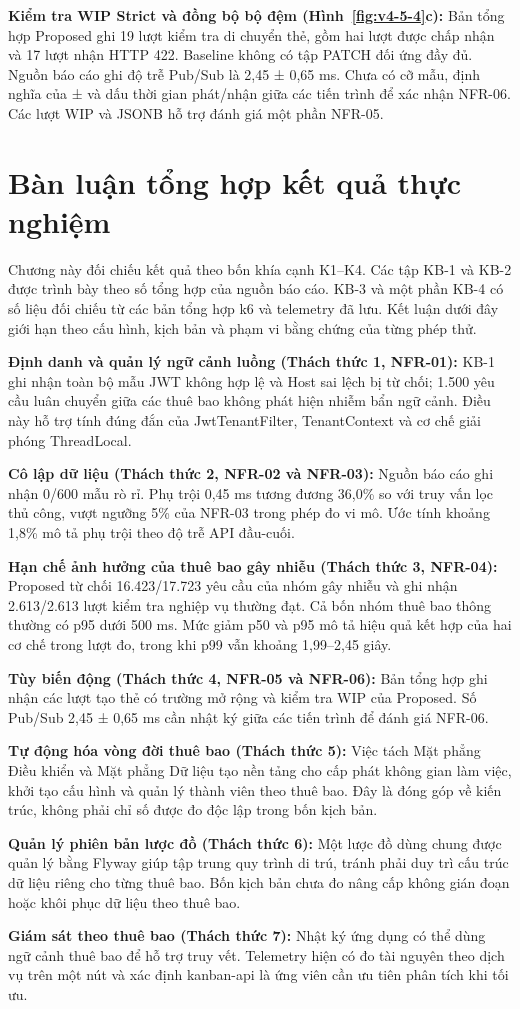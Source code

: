 \textbf{Kiểm tra WIP Strict và đồng bộ bộ đệm (Hình~\ref{fig:v4-5-4}c):} Bản tổng hợp Proposed ghi 19 lượt kiểm tra di chuyển thẻ, gồm hai lượt được chấp nhận và 17 lượt nhận HTTP 422. Baseline không có tập PATCH đối ứng đầy đủ. Nguồn báo cáo ghi độ trễ Pub/Sub là 2,45 ± 0,65 ms. Chưa có cỡ mẫu, định nghĩa của ± và dấu thời gian phát/nhận giữa các tiến trình để xác nhận NFR-06. Các lượt WIP và JSONB hỗ trợ đánh giá một phần NFR-05.

\section{Bàn luận tổng hợp kết quả thực nghiệm}\label{v4-sec-5-4}

Chương này đối chiếu kết quả theo bốn khía cạnh K1--K4. Các tập KB-1 và KB-2 được trình bày theo số tổng hợp của nguồn báo cáo. KB-3 và một phần KB-4 có số liệu đối chiếu từ các bản tổng hợp k6 và telemetry đã lưu. Kết luận dưới đây giới hạn theo cấu hình, kịch bản và phạm vi bằng chứng của từng phép thử.

\textbf{Định danh và quản lý ngữ cảnh luồng (Thách thức 1, NFR-01):} KB-1 ghi nhận toàn bộ mẫu JWT không hợp lệ và Host sai lệch bị từ chối; 1.500 yêu cầu luân chuyển giữa các thuê bao không phát hiện nhiễm bẩn ngữ cảnh. Điều này hỗ trợ tính đúng đắn của JwtTenantFilter, TenantContext và cơ chế giải phóng ThreadLocal.

\textbf{Cô lập dữ liệu (Thách thức 2, NFR-02 và NFR-03):} Nguồn báo cáo ghi nhận 0/600 mẫu rò rỉ. Phụ trội 0,45 ms tương đương 36,0\% so với truy vấn lọc thủ công, vượt ngưỡng 5\% của NFR-03 trong phép đo vi mô. Ước tính khoảng 1,8\% mô tả phụ trội theo độ trễ API đầu-cuối.

\textbf{Hạn chế ảnh hưởng của thuê bao gây nhiễu (Thách thức 3, NFR-04):} Proposed từ chối 16.423/17.723 yêu cầu của nhóm gây nhiễu và ghi nhận 2.613/2.613 lượt kiểm tra nghiệp vụ thường đạt. Cả bốn nhóm thuê bao thông thường có p95 dưới 500 ms. Mức giảm p50 và p95 mô tả hiệu quả kết hợp của hai cơ chế trong lượt đo, trong khi p99 vẫn khoảng 1,99--2,45 giây.

\textbf{Tùy biến động (Thách thức 4, NFR-05 và NFR-06):} Bản tổng hợp ghi nhận các lượt tạo thẻ có trường mở rộng và kiểm tra WIP của Proposed. Số Pub/Sub 2,45 ± 0,65 ms cần nhật ký giữa các tiến trình để đánh giá NFR-06.

\textbf{Tự động hóa vòng đời thuê bao (Thách thức 5):} Việc tách Mặt phẳng Điều khiển và Mặt phẳng Dữ liệu tạo nền tảng cho cấp phát không gian làm việc, khởi tạo cấu hình và quản lý thành viên theo thuê bao. Đây là đóng góp về kiến trúc, không phải chỉ số được đo độc lập trong bốn kịch bản.

\textbf{Quản lý phiên bản lược đồ (Thách thức 6):} Một lược đồ dùng chung được quản lý bằng Flyway giúp tập trung quy trình di trú, tránh phải duy trì cấu trúc dữ liệu riêng cho từng thuê bao. Bốn kịch bản chưa đo nâng cấp không gián đoạn hoặc khôi phục dữ liệu theo thuê bao.

\textbf{Giám sát theo thuê bao (Thách thức 7):} Nhật ký ứng dụng có thể dùng ngữ cảnh thuê bao để hỗ trợ truy vết. Telemetry hiện có đo tài nguyên theo dịch vụ trên một nút và xác định kanban-api là ứng viên cần ưu tiên phân tích khi tối ưu.
